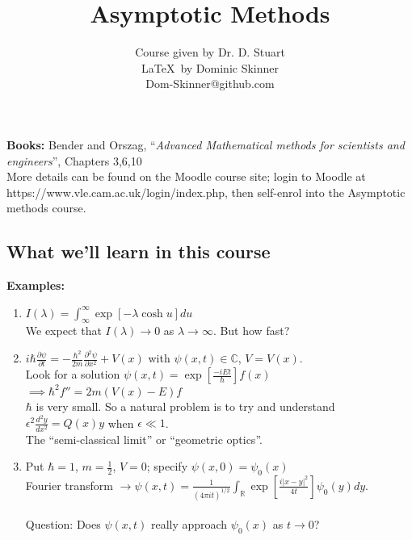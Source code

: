 \documentclass{article}
\newcommand{\pder}[2] {\frac{\partial {#1}}{\partial {#2} }}%
\begin{document}
\title{Asymptotic Methods}
\author{Course given by Dr. D. Stuart \\
\LaTeX\  by Dominic Skinner \\
Dom-Skinner@github.com}
\maketitle
\tableofcontents
\noindent \textbf{Books:} Bender and Orszag, ``\emph{Advanced Mathematical methods for 
scientists and engineers}'', Chapters 3,6,10 \\
More details can be found on the Moodle course site; login to Moodle at
https://www.vle.cam.ac.uk/login/index.php, then self-enrol into the
Asymptotic methods course.
\\
\subsection*{What we'll learn in this course}
\textbf{Examples:} 
\begin{enumerate}[1.]
\item $\displaystyle I(\lambda) = \int_{\infty}^{\infty} \exp[-\lambda \cosh u] du $
      \\ We expect that $I(\lambda) \to 0$ as $\lambda \to \infty$. But how fast?
\\
\item $\displaystyle i \hbar \pder{\psi}{t} = -\frac{\hbar^2}{2m}
      \pder{^2 \psi}{x^2} + V(x)$ with $\psi(x,t) \in \mathbb{C}$,
      $V = V(x)$. \\
      Look for a solution $\displaystyle \psi(x,t) = \exp \left[\frac{-iEt}{\hbar} 
      \right] f(x)$
      $\implies \hbar^2 f'' = 2m(V(x) -E)f$ 
      \\
      $\hbar$ is very small. So a natural problem is to try and understand
      $\displaystyle \epsilon^2 \frac{d^2y}{dx^2} = Q(x)y$ when $\epsilon \ll 1$.
      \\ The ``semi-classical limit'' or ``geometric optics''.
\\
\item Put $\hbar = 1$, $m=\frac{1}{2}$, $V=0$; specify $\psi(x,0) = \psi_0(x)$
      \\[2pt]
      Fourier transform $\displaystyle \to \psi(x,t) = \frac{1}{(4\pi i t)^{1/2}} 
      \int_{\mathbb{R}} \exp\left[ \frac{i|x-y|^2}{4t} \right] \psi_0(y) dy$.
      \\
      \\
      Question: Does $\psi(x,t)$ really approach $\psi_0(x)$ as $t\to0$?
\end{enumerate}
%
\end{document}
